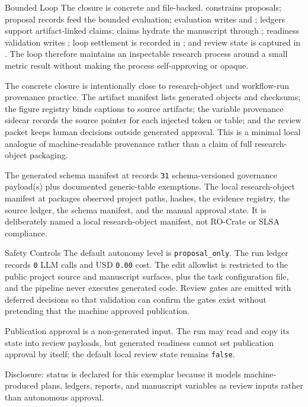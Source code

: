 \documentclass[
  ignorenonframetext,
]{beamer}
\begin{document}
\begin{frame}{Bounded Loop}
The closure is concrete and file-backed.
 constrains proposals;
proposal records feed the bounded evaluation; evaluation writes
 and
; ledgers support artifact-linked
claims; claims hydrate the manuscript through
; readiness validation
writes ; loop
settlement is recorded in
; and review state
is captured in . The loop
therefore maintains an inspectable research process around a small
metric result without making the process self-approving or opaque.

The concrete closure is intentionally close to research-object and
workflow-run provenance practice. The artifact manifest lists generated
objects and checksums; the figure registry binds captions to source
artifacts; the variable provenance sidecar records the source pointer
for each injected token or table; and the review packet keeps human
decisions outside generated approval. This is a minimal local analogue
of machine-readable provenance rather than a claim of full
research-object packaging.

The generated schema manifest at
 records
\texttt{31} schema-versioned governance payload(s) plus documented
generic-table exemptions. The local research-object manifest at
 packages observed
project paths, hashes, the evidence registry, the source ledger, the
schema manifest, and the manual approval state. It is deliberately named
a local research-object manifest, not RO-Crate or SLSA compliance.
\end{frame}

\begin{frame}{Safety Controls}
\protect{}\label{sec:safety-controls}
The default autonomy level is \texttt{proposal\_only}. The run ledger
records \texttt{0} LLM calls and USD \texttt{0.00} cost. The edit
allowlist is restricted to the public project source and manuscript
surfaces, plus the task configuration file, and the pipeline never
executes generated code. Review gates are emitted with deferred
decisions so that validation can confirm the gates exist without
pretending that the machine approved publication.

Publication approval is a non-generated input. The run may read
 and copy its state into review payloads, but
generated readiness cannot set publication approval by itself; the
default local review state remains \texttt{false}.

Disclosure:  status is declared for
this exemplar because it models machine-produced plans, ledgers,
reports, and manuscript variables as review inputs rather than
autonomous approval.
\end{frame}
\end{document}
